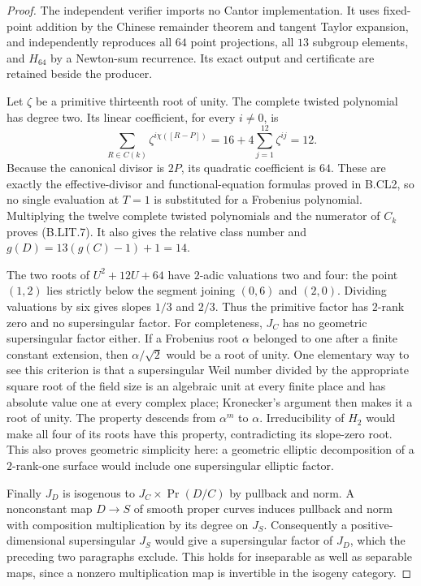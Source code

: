 \begin{proof}
The independent verifier
 imports no Cantor
implementation. It uses fixed-point addition by the
Chinese remainder theorem and tangent Taylor expansion,
and independently reproduces all $64$ point projections,
all $13$ subgroup elements, and $H_{64}$ by a Newton-sum
recurrence. Its exact output and certificate are retained
beside the producer.

Let $\zeta$ be a primitive thirteenth root of unity.
The complete twisted polynomial has degree two. Its
linear coefficient, for every $i\ne0$, is
\[
 \sum_{R\in C(k)}\zeta^{i\chi([R-P])}
       =16+4\sum_{j=1}^{12}\zeta^{ij}=12.
\]
Because the canonical divisor is $2P$, its quadratic
coefficient is $64$. These are exactly the effective-divisor
and functional-equation formulas proved in B.CL2, so no
single evaluation at $T=1$ is substituted for a Frobenius
polynomial. Multiplying the twelve complete twisted
polynomials and the numerator of $C_k$ proves (B.LIT.7).
It also gives the relative class number and
$g(D)=13(g(C)-1)+1=14$.

The two roots of $U^2+12U+64$ have $2$-adic valuations
two and four: the point $(1,2)$ lies strictly below the
segment joining $(0,6)$ and $(2,0)$. Dividing valuations
by six gives slopes $1/3$ and $2/3$. Thus the primitive
factor has $2$-rank zero and no supersingular factor.
For completeness, $J_C$ has no geometric supersingular
factor either. If a Frobenius root $\alpha$ belonged to
one after a finite constant extension, then
$\alpha/\sqrt2$ would be a root of unity. One elementary
way to see this criterion is that a supersingular Weil
number divided by the appropriate square root of the
field size is an algebraic unit at every finite place
and has absolute value one at every complex place;
Kronecker's argument then makes it a root of unity.
The property descends from $\alpha^m$ to $\alpha$.
Irreducibility of $H_2$ would make all four of its roots
have this property, contradicting its slope-zero root.
This also proves geometric simplicity here: a geometric
elliptic decomposition of a $2$-rank-one surface would
include one supersingular elliptic factor.

Finally $J_D$ is isogenous to $J_C\times\Pr(D/C)$
by pullback and norm. A nonconstant map $D\to S$ of
smooth proper curves induces pullback and norm with
composition multiplication by its degree on $J_S$.
Consequently a positive-dimensional supersingular
$J_S$ would give a supersingular factor of $J_D$,
which the preceding two paragraphs exclude. This holds
for inseparable as well as separable maps, since a
nonzero multiplication map is invertible in the
isogeny category.
\end{proof}

